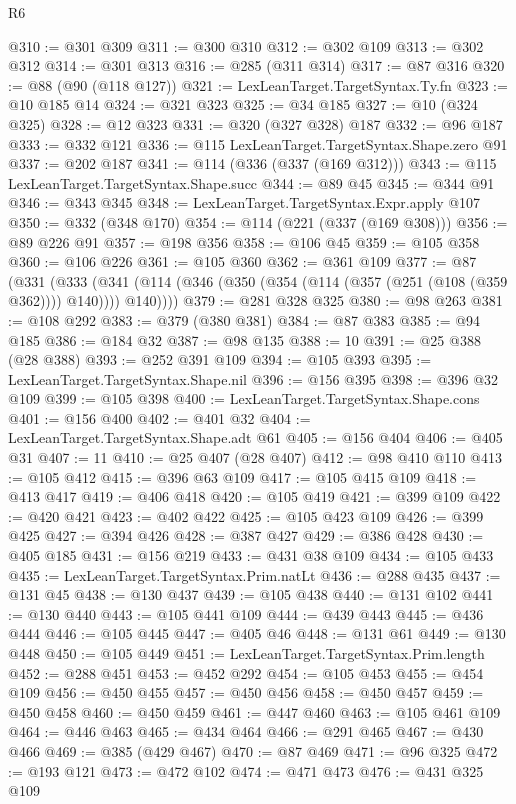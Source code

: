 \begin{lexlean}{R6}
\begin{coremodule}
{{{{{{{{{{{{{{{{{{{{{{{{{{{{{{{{{{{{{{{{{{{{{{{{{{{{{{{{{{{{{@310 := @301 @309
@311 := @300 @310
@312 := @302 @109
@313 := @302 @312
@314 := @301 @313
@316 := @285 (@311 @314)
@317 := @87 @316
@320 := @88 (@90 (@118 @127))
@321 := LexLeanTarget.TargetSyntax.Ty.fn
@323 := @10 @185 @14
@324 := @321 @323
@325 := @34 @185
@327 := @10 (@324 @325)
@328 := @12 @323
@331 := @320 (@327 @328) @187
@332 := @96 @187
@333 := @332 @121
@336 := @115 LexLeanTarget.TargetSyntax.Shape.zero @91
@337 := @202 @187
@341 := @114 (@336 (@337 (@169 @312)))
@343 := @115 LexLeanTarget.TargetSyntax.Shape.succ
@344 := @89 @45
@345 := @344 @91
@346 := @343 @345
@348 := LexLeanTarget.TargetSyntax.Expr.apply @107
@350 := @332 (@348 @170)
@354 := @114 (@221 (@337 (@169 @308)))
@356 := @89 @226 @91
@357 := @198 @356
@358 := @106 @45
@359 := @105 @358
@360 := @106 @226
@361 := @105 @360
@362 := @361 @109
@377 := @87
    (@331
      (@333 (@341 (@114 (@346 (@350 (@354 (@114 (@357 (@251 (@108 (@359 @362)))) @140)))) @140))))
@379 := @281 @328 @325
@380 := @98 @263
@381 := @108 @292
@383 := @379 (@380 @381)
@384 := @87 @383
@385 := @94 @185
@386 := @184 @32
@387 := @98 @135
@388 := 10
@391 := @25 @388 (@28 @388)
@393 := @252 @391 @109
@394 := @105 @393
@395 := LexLeanTarget.TargetSyntax.Shape.nil
@396 := @156 @395
@398 := @396 @32 @109
@399 := @105 @398
@400 := LexLeanTarget.TargetSyntax.Shape.cons
@401 := @156 @400
@402 := @401 @32
@404 := LexLeanTarget.TargetSyntax.Shape.adt @61
@405 := @156 @404
@406 := @405 @31
@407 := 11
@410 := @25 @407 (@28 @407)
@412 := @98 @410 @110
@413 := @105 @412
@415 := @396 @63 @109
@417 := @105 @415 @109
@418 := @413 @417
@419 := @406 @418
@420 := @105 @419
@421 := @399 @109
@422 := @420 @421
@423 := @402 @422
@425 := @105 @423 @109
@426 := @399 @425
@427 := @394 @426
@428 := @387 @427
@429 := @386 @428
@430 := @405 @185
@431 := @156 @219
@433 := @431 @38 @109
@434 := @105 @433
@435 := LexLeanTarget.TargetSyntax.Prim.natLt
@436 := @288 @435
@437 := @131 @45
@438 := @130 @437
@439 := @105 @438
@440 := @131 @102
@441 := @130 @440
@443 := @105 @441 @109
@444 := @439 @443
@445 := @436 @444
@446 := @105 @445
@447 := @405 @46
@448 := @131 @61
@449 := @130 @448
@450 := @105 @449
@451 := LexLeanTarget.TargetSyntax.Prim.length
@452 := @288 @451
@453 := @452 @292
@454 := @105 @453
@455 := @454 @109
@456 := @450 @455
@457 := @450 @456
@458 := @450 @457
@459 := @450 @458
@460 := @450 @459
@461 := @447 @460
@463 := @105 @461 @109
@464 := @446 @463
@465 := @434 @464
@466 := @291 @465
@467 := @430 @466
@469 := @385 (@429 @467)
@470 := @87 @469
@471 := @96 @325
@472 := @193 @121
@473 := @472 @102
@474 := @471 @473
@476 := @431 @325 @109
}}}}}}}}}}}}}}}}}}}}}}}}}}}}}}}}}}}}}}}}}}}}}}}}}}}}}}}}}}}}}
\end{coremodule}
\end{lexlean}
